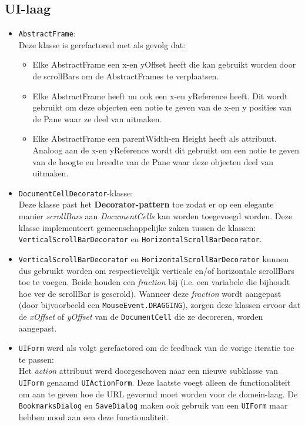 \documentclass[12pt]{article}
\begin{document}
\subsection{UI-laag}
\begin{itemize}
	\item \texttt{AbstractFrame}:\\
	Deze klasse is gerefactored met als gevolg dat:
	\begin{itemize}
		\item Elke AbstractFrame een x-en yOffset heeft die kan gebruikt worden door de scrollBars om de AbstractFrames te verplaatsen.
		\item Elke AbstractFrame heeft nu ook een x-en yReference heeft. Dit wordt gebruikt om deze objecten een notie te geven van de x-en y posities van de Pane waar ze deel van uitmaken.
		\item Elke AbstractFrame een parentWidth-en Height heeft als attribuut. Analoog aan de x-en yReference wordt dit gebruikt om een notie te geven van de hoogte en breedte van de Pane waar deze objecten deel van uitmaken.
	\end{itemize}
	\item \texttt{DocumentCellDecorator}-klasse:\\
	Deze klasse past het \textbf{Decorator-pattern} toe zodat er op een elegante manier \textit{scrollBars} aan \textit{DocumentCells} kan worden toegevoegd worden. Deze klasse implementeert gemeenschappelijke zaken tussen de klassen: \texttt{VerticalScrollBarDecorator} en \texttt{HorizontalScrollBarDecorator}.
	\item \texttt{VerticalScrollBarDecorator} en \texttt{HorizontalScrollBarDecorator} kunnen dus gebruikt worden om respectievelijk verticale en/of horizontale scrollBars toe te voegen. Beide houden een \textit{fraction} bij (i.e. een variabele die bijhoudt hoe ver de scrollBar is gescrold). Wanneer deze \textit{fraction} wordt aangepast (door bijvoorbeeld een \texttt{MouseEvent.DRAGGING}), zorgen deze klassen ervoor dat de \textit{xOffset} of \textit{yOffset} van de \texttt{DocumentCell} die ze decoreren, worden aangepast.
	\item \texttt{UIForm} werd als volgt gerefactored om de feedback van de vorige iteratie toe te passen:\\
	Het \textit{action} attribuut werd doorgeschoven naar een nieuwe subklasse van \texttt{UIForm} genaamd \texttt{UIActionForm}. Deze laatste voegt alleen de functionaliteit om aan te geven hoe de URL gevormd moet worden voor de domein-laag. De \texttt{BookmarksDialog} en \texttt{SaveDialog} maken ook gebruik van een \texttt{UIForm} maar hebben nood aan een deze functionaliteit.\\
	 
\end{itemize}
\end{document}
